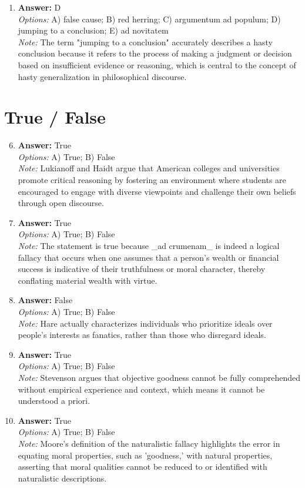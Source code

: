 \documentclass[12pt]{article}
\begin{document}
\begin{enumerate}[label=\arabic*.]
\\ \textit{Note:} Nathanson supports proportional retributivism because it asserts that the punishment should be commensurate with the severity of the crime, aligning with his belief in a fair and just response to wrongdoing.
\item \textbf{Answer:} D
\\ \textit{Options:} A) false cause; B) red herring; C) argumentum ad populum; D) jumping to a conclusion; E) ad novitatem
\\ \textit{Note:} The term "jumping to a conclusion" accurately describes a hasty conclusion because it refers to the process of making a judgment or decision based on insufficient evidence or reasoning, which is central to the concept of hasty generalization in philosophical discourse.
\end{enumerate}

\section*{True / False}
\begin{enumerate}[label=\arabic*.]
\setcounter{enumi}{5}
\item \textbf{Answer:} True
\\ \textit{Options:} A) True; B) False
\\ \textit{Note:} Lukianoff and Haidt argue that American colleges and universities promote critical reasoning by fostering an environment where students are encouraged to engage with diverse viewpoints and challenge their own beliefs through open discourse.
\item \textbf{Answer:} True
\\ \textit{Options:} A) True; B) False
\\ \textit{Note:} The statement is true because \_ad crumenam\_ is indeed a logical fallacy that occurs when one assumes that a person's wealth or financial success is indicative of their truthfulness or moral character, thereby conflating material wealth with virtue.
\item \textbf{Answer:} False
\\ \textit{Options:} A) True; B) False
\\ \textit{Note:} Hare actually characterizes individuals who prioritize ideals over people's interests as fanatics, rather than those who disregard ideals.
\item \textbf{Answer:} True
\\ \textit{Options:} A) True; B) False
\\ \textit{Note:} Stevenson argues that objective goodness cannot be fully comprehended without empirical experience and context, which means it cannot be understood a priori.
\item \textbf{Answer:} True
\\ \textit{Options:} A) True; B) False
\\ \textit{Note:} Moore's definition of the naturalistic fallacy highlights the error in equating moral properties, such as 'goodness,' with natural properties, asserting that moral qualities cannot be reduced to or identified with naturalistic descriptions.
\end{enumerate}
\end{document}
